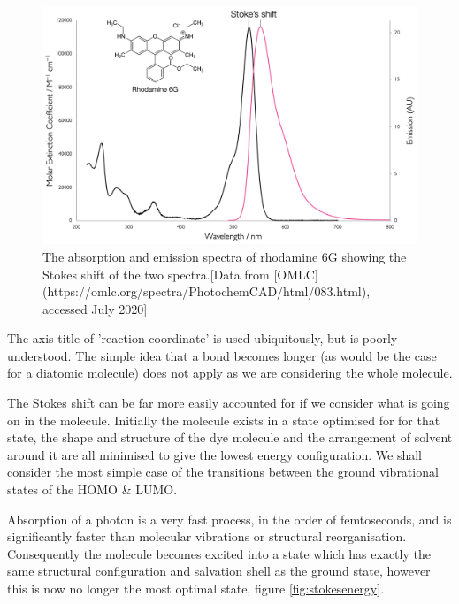 \documentclass[
]{book}
\begin{document}
\begin{figure}

{\centering \includegraphics[width=0.7\linewidth]{images/stokesspectrum} 

}

\caption{The absorption and emission spectra of rhodamine 6G showing the Stokes shift of the two spectra.[Data from [OMLC](https://omlc.org/spectra/PhotochemCAD/html/083.html), accessed July 2020]}\label{fig:stokesspectrum}
\end{figure}

The axis title of 'reaction coordinate' is used ubiquitously, but is poorly understood. The simple idea that a bond becomes longer (as would be the case for a diatomic molecule) does not apply as we are considering the whole molecule.

The Stokes shift can be far more easily accounted for if we consider what is going on in the molecule. Initially the molecule exists in a state optimised for for that state, the shape and structure of the dye molecule and the arrangement of solvent around it are all minimised to give the lowest energy configuration. We shall consider the most simple case of the transitions between the ground vibrational states of the HOMO \& LUMO.

Absorption of a photon is a very fast process, in the order of femtoseconds, and is significantly faster than molecular vibrations or structural reorganisation. Consequently the molecule becomes excited into a state which has exactly the same structural configuration and salvation shell as the ground state, however this is now no longer the most optimal state, figure \ref{fig:stokesenergy}.
\end{document}
